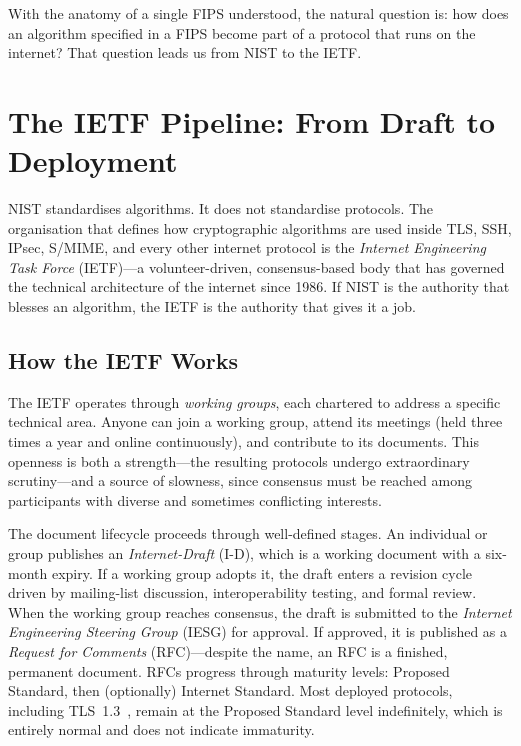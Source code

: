 With the anatomy of a single FIPS understood, the natural question is: how does an algorithm specified in a FIPS become part of a protocol that runs on the internet? That question leads us from NIST to the IETF.


\section{The IETF Pipeline: From Draft to Deployment}
\label{sec:ietf-pipeline}

NIST standardises algorithms. It does not standardise protocols. The organisation that defines how cryptographic algorithms are used inside TLS, SSH, IPsec, S/MIME, and every other internet protocol is the \emph{Internet Engineering Task Force} (IETF)---a volunteer-driven, consensus-based body that has governed the technical architecture of the internet since 1986. If NIST is the authority that blesses an algorithm, the IETF is the authority that gives it a job.

\subsection{How the IETF Works}
\label{subsec:ietf-process}

The IETF operates through \emph{working groups}, each chartered to address a specific technical area. Anyone can join a working group, attend its meetings (held three times a year and online continuously), and contribute to its documents. This openness is both a strength---the resulting protocols undergo extraordinary scrutiny---and a source of slowness, since consensus must be reached among participants with diverse and sometimes conflicting interests.

The document lifecycle proceeds through well-defined stages. An individual or group publishes an \emph{Internet-Draft} (I-D), which is a working document with a six-month expiry. If a working group adopts it, the draft enters a revision cycle driven by mailing-list discussion, interoperability testing, and formal review. When the working group reaches consensus, the draft is submitted to the \emph{Internet Engineering Steering Group} (IESG) for approval. If approved, it is published as a \emph{Request for Comments} (RFC)---despite the name, an RFC is a finished, permanent document. RFCs progress through maturity levels: Proposed Standard, then (optionally) Internet Standard. Most deployed protocols, including TLS~1.3~\cite{RFC8446}, remain at the Proposed Standard level indefinitely, which is entirely normal and does not indicate immaturity.


